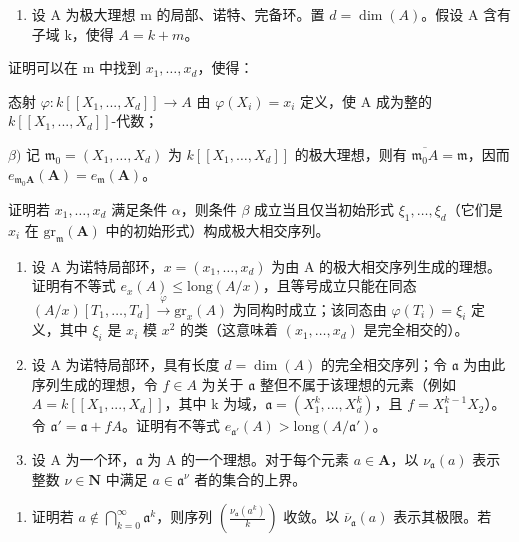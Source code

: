 \begin{enumerate}
\def\labelenumi{\arabic{enumi})}
\setcounter{enumi}{14}
\tightlist
\item
  设 A 为极大理想 m 的局部、诺特、完备环。置 \(d = \dim(A)\)。假设 A 含有子域 k，使得 \(A = k + m\)。
\end{enumerate}

证明可以在 m 中找到 \(x_{1},\ldots,x_{d}\)，使得：

  态射 \(\varphi:k[[X_{1},...,X_{d}]]\to A\) 由 \(\varphi(X_{i})=x_{i}\) 定义，使 A 成为整的 \(k[[X_{1},...,X_{d}]]\)-代数；

\(\beta)\) 记 \(\mathfrak{m}_0 = (X_1, \ldots, X_d)\) 为 \(k[[X_1, \ldots, X_d]]\) 的极大理想，则有 \(\overline{\mathfrak{m}_0A} = \mathfrak{m}\)，因而 \(e_{\mathfrak{m}_0\mathbf{A}}(\mathbf{A}) = e_{\mathfrak{m}}(\mathbf{A})\)。

  证明若 \(x_{1},\ldots,x_{d}\) 满足条件 \(\alpha\)，则条件 \(\beta\) 成立当且仅当初始形式 \(\xi_{1},\ldots,\xi_{d}\)（它们是 \(x_{i}\) 在 \(\mathrm{gr}_{\mathfrak{m}}(\mathbf{A})\) 中的初始形式）构成极大相交序列。

\begin{enumerate}
\def\labelenumi{\arabic{enumi})}
\setcounter{enumi}{15}
\item
  设 A 为诺特局部环，\(x = (x_1, \ldots, x_d)\) 为由 A 的极大相交序列生成的理想。证明有不等式 \(e_x(A) \leqslant \text{long}(A/x)\)，且等号成立只能在同态 \((A/x)[T_1, \ldots, T_d] \xrightarrow{\varphi} \text{gr}_x(A)\) 为同构时成立；该同态由 \(\varphi(T_i) = \xi_i\) 定义，其中 \(\xi_i\) 是 \(x_i\) 模 \(x^2\) 的类（这意味着 \((x_1, \ldots, x_d)\) 是完全相交的）。
\item
  设 A 为诺特局部环，具有长度 \(d = \dim(A)\) 的完全相交序列；令 \(\mathfrak{a}\) 为由此序列生成的理想，令 \(f \in A\) 为关于 \(\mathfrak{a}\) 整但不属于该理想的元素（例如 \(A = k[[X_1, ..., X_d]]\)，其中 k 为域，\(\mathfrak{a} = (X_1^k, ..., X_d^k)\)，且 \(f = X_1^{k-1}X_2\)）。令 \(\mathfrak{a}' = \mathfrak{a} + fA\)。证明有不等式 \(e_{\mathfrak{a}'}(A) > \text{long}(A/\mathfrak{a}')\)。
\item
  设 A 为一个环，\(\mathfrak{a}\) 为 A 的一个理想。对于每个元素 \(a \in \mathbf{A}\)，以 \(\nu_{\mathfrak{a}}(a)\) 表示整数 \(\nu \in \mathbf{N}\) 中满足 \(a \in \mathfrak{a}^{\nu}\) 者的集合的上界。
\end{enumerate}

\begin{enumerate}
\def\labelenumi{\alph{enumi})}
\tightlist
\item
  证明若 \(a \notin \bigcap_{k=0}^{\infty} \mathfrak{a}^k\)，则序列 \(\left(\frac{\nu_{\mathfrak{a}}(a^k)}{k}\right)\) 收敛。以 \(\overline{\nu}_{\mathfrak{a}}(a)\) 表示其极限。若
\end{enumerate}

